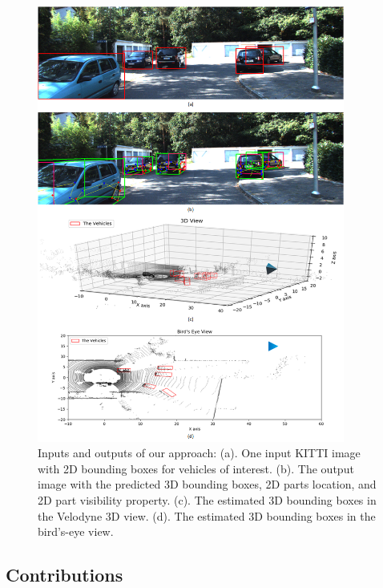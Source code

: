 \documentclass[a4paper,12pt]{article}
\begin{document}
\begin{figure}[H]		
	\includegraphics[width=0.9\textwidth]{overall_example.png}
	\caption[Inputs and outputs of our approach.]{Inputs and outputs of our approach: (a). One input KITTI image with 2D bounding boxes for vehicles of interest. (b). The output image with the predicted 3D bounding boxes, 2D parts location, and 2D part visibility property. (c). The estimated 3D bounding boxes in the Velodyne 3D view. (d). The estimated 3D bounding boxes in the bird's-eye view.}
	\centering
	\label{overall_example}
\end{figure}


\subsection{Contributions}
\end{document}
